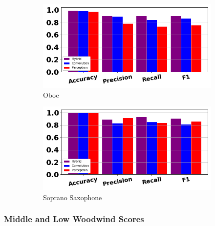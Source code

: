\documentclass[12pt,letterpaper]{article}
\begin{document}
\begin{figure}[H]
	\begin{subfigure}[b]{0.45\textwidth}
	\centering
	\includegraphics[width=\textwidth]{../FiguresClasses/Oboe}
	\caption{Oboe}
	\end{subfigure}
	\hfill	
	\begin{subfigure}[b]{0.45 \textwidth}
	\centering
	\includegraphics[width=\textwidth]{../FiguresClasses/SopSax}
	\caption{Soprano Saxophone}
	\end{subfigure}
	
\caption{}
\label{fig-HighWindsScores}
\end{figure}


\subsubsection{Middle and Low Woodwind Scores}
\end{document}
